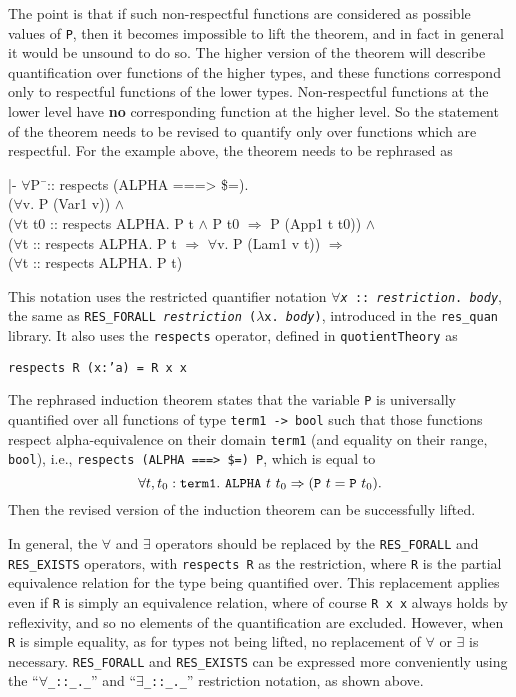 \documentclass[envcountsame,runningheads]{llncs}
\newcommand{\quotient}{partial equivalence}
\begin{document}
The point is that if such non-respectful functions are considered as 
possible values of {\tt P}, then it becomes impossible to lift the
theorem, and in fact in general it would be unsound to do so. 
The higher version of the theorem will describe quantification over
functions of the higher types, and these functions correspond only to 
respectful functions of the lower types.  Non-respectful functions at the
lower level have
{\bf no} corresponding function at the higher level.  So the statement of the
theorem needs to be revised to quantify only over functions which are
respectful. 
For the example above, the theorem needs to be
rephrased
as
{\tt \begin{tabbing}
|- $\forall$P\=\ :: respects (ALPHA ===> \$=). \\
\>     ($\forall$v. P (Var1 v)) $\wedge$ \\
\>     ($\forall$t t0 :: respects ALPHA. P t $\wedge$ P t0 $\Rightarrow$ P (App1 t t0)) $\wedge$ \\
\>     ($\forall$t :: respects ALPHA. P t $\Rightarrow$ $\forall$v. P (Lam1 v t)) $\Rightarrow$ \\
\>     ($\forall$t :: respects ALPHA. P t)
\end{tabbing}}

This notation uses the restricted quantifier notation
{\tt $\forall${\it x} :: {\it restriction}. {\it body}},
the same as
{\tt RES\_FORALL {\it restriction} ($\lambda$x. {\it body})},
introduced in
the {\tt res\_quan} library. It also uses the {\tt respects} operator,
defined in {\tt quotientTheory} as
\begin{center}
{\tt respects R (x:'a) = R x x}
\end{center}
The rephrased induction theorem
states that the variable {\tt P}
is universally quantified over all functions of type {\tt term1 -> bool}
such that those functions respect alpha-equivalence on their domain
{\tt term1}
(and equality on their range,
{\tt bool}),
i.e., {\tt respects (ALPHA ===> \$=) P}, which is equal to
$$\forall t,t_0 : {\tt term1}.\ 
{\tt ALPHA}\ t\ t_0 \Rightarrow ({\tt P}\ t = {\tt P}\ t_0).$$
Then the revised version of the induction theorem can be successfully
lifted.

In general, the {\tt $\forall$} and {\tt $\exists$}
operators should be replaced by the
{\tt RES\_FORALL} and
{\tt RES\_EXISTS} operators,
with {\tt respects R} as the restriction, where {\tt R} is the
\quotient{} relation for the type being quantified over.
This replacement applies even if {\tt R} is simply an equivalence relation,
where of course {\tt R x x} always holds by reflexivity, and so
no elements of the quantification are excluded.
However, when {\tt R} is simple equality, as for types not being lifted,
no replacement of {\tt $\forall$} or {\tt $\exists$}
is necessary.
{\tt RES\_FORALL} and {\tt RES\_EXISTS} can be
expressed more conveniently using the
``{\tt $\forall$\_::\_.\_}'' and
``{\tt $\exists$\_::\_.\_}''
restriction notation, as shown above.
\end{document}
